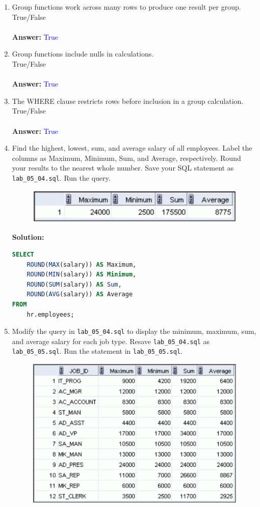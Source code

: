 \documentclass[a4paper,12pt]{article}
\begin{document}
\begin{enumerate}
    \item Group functions work across many rows to produce one result per group.\\
True/False\\\\
    \textbf{Answer: }\textcolor{blue}{True}
    \item Group functions include nulls in calculations. \\
True/False\\\\
    \textbf{Answer: }\textcolor{blue}{True}
    \item The WHERE clause restricts rows before inclusion in a group calculation.\\
True/False\\\\
    \textbf{Answer: }\textcolor{blue}{True}

    \item     Find the highest, lowest, sum, and average salary of all employees. Label the columns
as Maximum, Minimum, Sum, and Average, respectively. Round your results to the nearest
whole number. Save your SQL statement as \texttt{lab\_05\_04.sql}. Run the query.
    \begin{figure}[h]
        \centering
        \includegraphics[width=.5\linewidth]{graphics/64.png}
    \end{figure}

    \textbf{Solution: }
    \begin{lstlisting}[language=SQL]
SELECT 
    ROUND(MAX(salary)) AS Maximum,
    ROUND(MIN(salary)) AS Minimum,
    ROUND(SUM(salary)) AS Sum,
    ROUND(AVG(salary)) AS Average
FROM 
    hr.employees;
    \end{lstlisting}
        \item Modify the query in \texttt{lab\_05\_04.sql} to display the minimum, maximum, sum, and average
salary for each job type. Resave \texttt{lab\_05\_04.sql} as \texttt{lab\_05\_05.sql}. Run the statement
in \texttt{lab\_05\_05.sql}.
    \begin{figure}[h]
        \centering
        \includegraphics[width=.5\linewidth]{graphics/65.png}
    \end{figure}


\end{enumerate}
\end{document}
